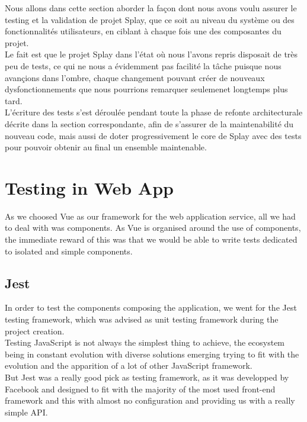 \documentclass{eplmastersthesis}
\begin{document}
    Nous allons dans cette section aborder la façon dont nous avons voulu assurer
    le testing et la validation de projet Splay, que ce soit au niveau du système
    ou des fonctionnalités utilisateurs, en ciblant à chaque fois une des
    composantes du projet.\\

    Le fait est que le projet Splay dans l'état où nous l'avons repris disposait
    de très peu de tests, ce qui ne nous a évidemment pas facilité la tâche puisque
    nous avançions dans l'ombre, chaque changement pouvant créer de nouveaux
    dysfonctionnements que nous pourrions remarquer seulemenet longtemps plus tard.\\

    L'écriture des tests s'est déroulée pendant toute la phase de refonte
    architecturale décrite dans la section correspondante, afin de s'assurer
    de la maintenabilité du nouveau code, mais aussi de doter progressivement
    le core de Splay avec des tests pour pouvoir obtenir au final un ensemble
    maintenable.\\

    \section{Testing in Web App}

      As we choosed Vue as our framework for the web application service,
      all we had to deal with was components. As Vue is organised around
      the use of components, the immediate reward of this was that we would
      be able to write tests dedicated to isolated and simple components.

      \subsection{Jest}

        In order to test the components composing the application, we
        went for the Jest \cite{jest} testing framework, which was advised
        as unit testing framework during the project creation.\\

        Testing JavaScript is not always the simplest thing to achieve, the
        ecosystem being in constant evolution with diverse solutions emerging
        trying to fit with the evolution and the apparition of a lot of
        other JavaScript framework.\\
        But Jest was a really good pick as testing framework, as it was
        developped by Facebook and designed to fit with the majority of the
        most used front-end framework and this with almost no configuration and
        providing us with a really simple API.\\
\end{document}
